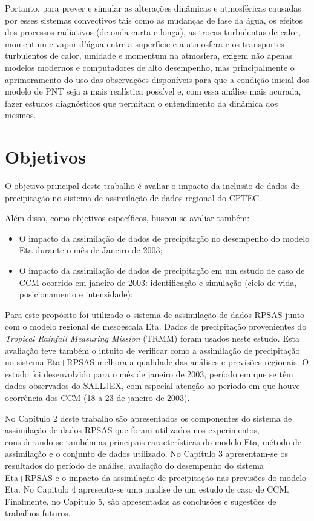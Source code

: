 Portanto, para prever e simular as alterações dinâmicas e atmosféricas causadas por esses sistemas convectivos tais como as mudanças de fase da água, os efeitos dos processos radiativos (de onda curta e longa), as trocas turbulentas de calor, momentum e vapor d'água entre a superfície e a atmosfera e os transportes turbulentos de calor, umidade e momentum na atmosfera, exigem não apenas modelos modernos e computadores de alto desempenho, mas principalmente o aprimoramento do uso das observações disponíveis para que a condição inicial dos modelo de PNT seja a mais realística possível e, com essa análise mais acurada, fazer estudos diagnósticos que permitam o entendimento da dinâmica dos mesmos.

\section{Objetivos}
\label{ss:objetivos} 

O objetivo principal deste trabalho é avaliar o impacto da inclusão de dados de precipitação no sistema de assimilação de dados regional do CPTEC.

Além disso, como objetivos específicos, buscou-se avaliar também:

\begin{itemize}
\item O impacto da assimilação de dados de precipitação no desempenho do modelo Eta durante o mês de Janeiro de 2003;
\item O impacto da assimilação de dados de precipitação em um estudo de caso de CCM ocorrido em janeiro de 2003: identificação e simulação (ciclo de vida, posicionamento e intensidade);
\end{itemize}

Para este propósito foi utilizado o sistema de assimilação de dados RPSAS junto com o modelo regional de mesoescala Eta. Dados de precipitação provenientes do \textit{Tropical Rainfall Measuring Mission} (TRMM) foram usados neste estudo. Esta avaliação teve também o intuito de verificar como a assimilação de precipitação no sistema Eta+RPSAS melhora a qualidade das análises e previsões regionais. O estudo foi desenvolvido para o mês de janeiro de 2003, período em que se têm dados observados do SALLJEX, com especial atenção ao período em que houve ocorrência dos CCM (18 a 23 de janeiro de 2003). 

No Capítulo 2 deste trabalho são apresentados os componentes do sistema de assimilação de dados RPSAS que foram utilizados nos experimentos, considerando-se também as principais características do modelo Eta, método de assimilação e o conjunto de dados utilizado. No Capítulo 3 apresentam-se os resultados do período de análise, avaliação do desempenho do sistema Eta+RPSAS e o impacto da assimilação de  precipitação nas previsões do modelo Eta. No Capitulo 4 apresenta-se uma analise de um estudo de caso de CCM.  Finalmente, no Capitulo 5, são apresentadas as conclusões e sugestões de trabalhos futuros.